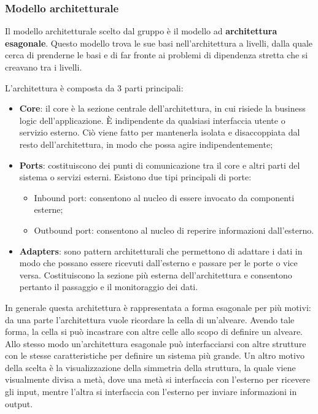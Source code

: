 \subsubsection{Modello architetturale}
\par Il modello architetturale scelto dal gruppo è il modello ad \textbf{architettura esagonale}. Questo modello trova le sue basi nell'architettura a livelli, dalla quale cerca di prenderne le basi e di far fronte ai problemi di dipendenza stretta che si creavano tra i livelli.
\par L'architettura è composta da 3 parti principali:
\begin{itemize}
    \item \textbf{Core}: il core è la sezione centrale dell'architettura, in cui risiede la business logic dell'applicazione. È indipendente da qualsiasi interfaccia utente o servizio esterno. Ciò viene fatto per mantenerla isolata e disaccoppiata dal resto dell'architettura, in modo che possa agire indipendentemente;
    \item \textbf{Ports}: costituiscono dei punti di comunicazione tra il core e altri parti del sistema o servizi esterni. Esistono due tipi principali di porte:
    \begin{itemize}
        \item Inbound port: consentono al nucleo di essere invocato da componenti esterne;
        \item Outbound port: consentono al nucleo di reperire informazioni dall'esterno.
    \end{itemize}
    \item \textbf{Adapters}: sono pattern architetturali che permettono di adattare i dati in modo che possano essere ricevuti dall'esterno e passare per le porte o vice versa. Costituiscono la sezione più esterna dell'architettura e consentono pertanto il passaggio e il monitoraggio dei dati.
\end{itemize}
\par In generale questa architettura è rappresentata a forma esagonale per più motivi: da una parte l'architettura vuole ricordare la cella di un'alveare. Avendo tale forma, la cella si può incastrare con altre celle allo scopo di definire un alveare. Allo stesso modo un'architettura esagonale può interfacciarsi con altre strutture con le stesse caratteristiche per definire un sistema più grande. Un altro motivo della scelta è la visualizzazione della simmetria della struttura, la quale viene visualmente divisa a metà, dove una metà si interfaccia con l'esterno per ricevere gli input, mentre l'altra si interfaccia con l'esterno per inviare informazioni in output.
